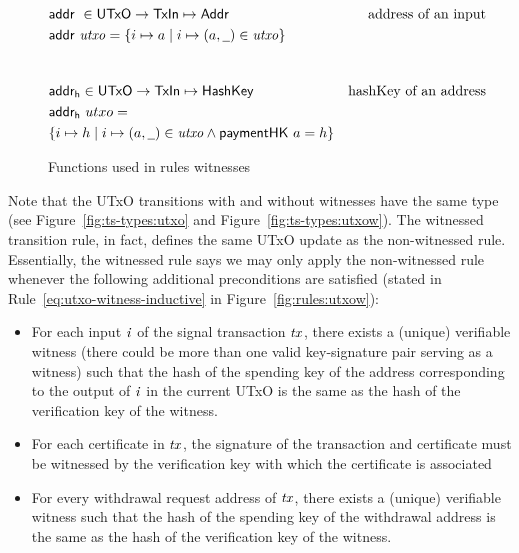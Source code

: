 \documentclass[11pt,a4paper,dvipsnames]{article}
\newcommand{\Addr}{\type{Addr}}
\newcommand{\UTxO}{\type{UTxO}}
\newcommand{\TxIn}{\type{TxIn}}
\newcommand{\HashKey}{\type{HashKey}}
\newcommand{\addr}[1]{\fun{addr}~ \var{#1}}
\newcommand{\wcard}[0]{\underline{\phantom{a}}}
\theoremstyle{definition}
\theoremstyle{definition}
\begin{document}
\begin{figure}
  \begin{align*}
    & \addr{}{} \in \UTxO \to \TxIn \mapsto \Addr & \text{address of an input}\\
    & \addr{utxo} = \{ i \mapsto a \mid i \mapsto (a, \wcard) \in \var{utxo} \} \\
    \nextdef
    & \fun{addr_h} \in \UTxO \to \TxIn \mapsto \HashKey &
        \text{hashKey of an address}\\
    & \fun{addr_h}~utxo = \\
      &
      \{ i \mapsto h \mid i \mapsto (a, \wcard) \in \var{utxo}
        \wedge \fun{paymentHK}~{a} = h \} \\
  \end{align*}
  \caption{Functions used in rules witnesses}
  \label{fig:derived-defs:utxow}
\end{figure}


Note that the UTxO transitions with and without witnesses have the same type
(see Figure~\ref{fig:ts-types:utxo} and Figure~\ref{fig:ts-types:utxow}).
The witnessed transition rule, in fact, defines the same UTxO update as the
non-witnessed rule. Essentially, the witnessed rule says we may only apply the non-witnessed rule whenever the following
additional preconditions are satisfied
(stated in Rule~\ref{eq:utxo-witness-inductive} in
Figure~\ref{fig:rules:utxow}):

\begin{itemize}
 \item For each input $\mathit{i}$ of the signal transaction $\mathit{tx}$,
 there exists a (unique) verifiable witness (there could be more than one valid
 key-signature pair serving as a witness) such that the hash of the spending key
 of the address corresponding to the output of $\mathit{i}$ in the current UTxO
 is the same as the hash of the verification key of the witness.

 \item For each certificate in $\mathit{tx}$, the signature of the transaction
 and certificate must be witnessed by the
   verification key with which the certificate is associated

 \item For every withdrawal request address of $\mathit{tx}$,
 there exists a (unique) verifiable witness such that the hash of the spending key of the
 withdrawal address is the same as the hash of the verification key of the witness.
\end{itemize}
\end{document}
